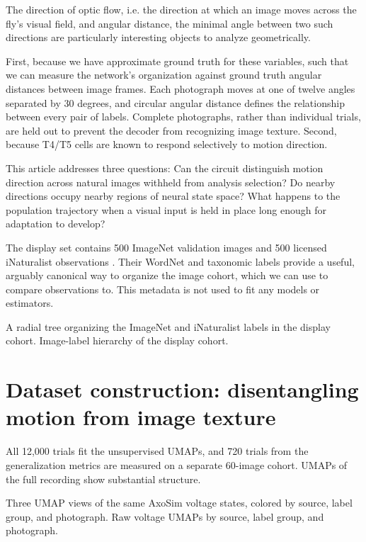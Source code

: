 \documentclass[11pt]{article}
\begin{document}
The direction of optic flow, i.e. the direction at which an image moves across the fly's visual field, and angular distance, the minimal angle between two such directions are particularly interesting objects to analyze geometrically.

First, because we have approximate ground truth for these variables, such that we can measure the network's organization against ground truth angular distances between image frames. Each photograph moves at one of twelve angles separated by 30 degrees, and circular angular distance defines the relationship between every pair of labels. Complete photographs, rather than individual trials, are held out to prevent the decoder from recognizing image texture. Second, because T4/T5 cells are known to respond selectively to motion direction. 

This article addresses three questions: Can the circuit distinguish motion direction across natural images withheld from analysis selection? Do nearby directions occupy nearby regions of neural state space? What happens to the population trajectory when a visual input is held in place long enough for adaptation to develop?

The display set contains 500 ImageNet validation images and 500 licensed iNaturalist observations \cite{imagenet,inaturalist}. Their WordNet and taxonomic labels provide a useful, arguably canonical way to organize the image cohort, which we can use to compare observations to. This metadata is not used to fit any models or estimators. 

  {A radial tree organizing the ImageNet and iNaturalist labels in the display cohort.}
  {Image-label hierarchy of the display cohort.}

\section{Dataset construction: disentangling motion from image texture}

All 12,000 trials fit the unsupervised UMAPs, and 720 trials from the generalization metrics are measured on a separate 60-image cohort. UMAPs of the full recording show substantial structure.

  {Three UMAP views of the same AxoSim voltage states, colored by source, label group, and photograph.}
  {Raw voltage UMAPs by source, label group, and photograph.}
\end{document}
